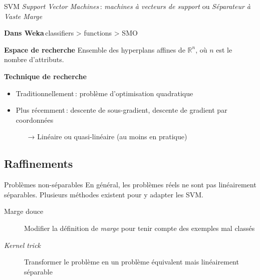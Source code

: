 \documentclass[hyperref={unicode}, xcolor={svgnames}, french]{beamer}
\begin{document}
\begin{frame}{SVM}
    \emph{Support Vector Machines} : \emph{machines à vecteurs de support} ou \emph{Séparateur à Vaste Marge}

    \textbf{Dans Weka} classifiers > functions > SMO
    \pause

    \textbf{Espace de recherche} Ensemble des hyperplans affines de $ℝ^n$, où $n$ est le nombre d'attributs.
    \pause

    \textbf{Technique de recherche}
    \begin{itemize}
        \item Traditionnellement : problème d'optimisation quadratique
        \item Plus récemment : descente de sous-gradient, descente de gradient par coordonnées
        \begin{itemize}
            \item[→] Linéaire ou quasi-linéaire (au moins en pratique)
        \end{itemize}
    \end{itemize}
\end{frame}


\subsection{Raffinements}
\begin{frame}{Problèmes non-séparables}
    En général, les problèmes réels ne sont pas linéairement séparables.
    Plusieurs méthodes existent pour y adapter les SVM.
    \begin{description}
        \item[Marge douce] Modifier la définition de \emph{marge} pour tenir compte des exemples mal classés
        \item[\emph{Kernel trick}] Transformer le problème en un problème équivalent mais linéairement séparable
    \end{description}
\end{frame}
\end{document}
